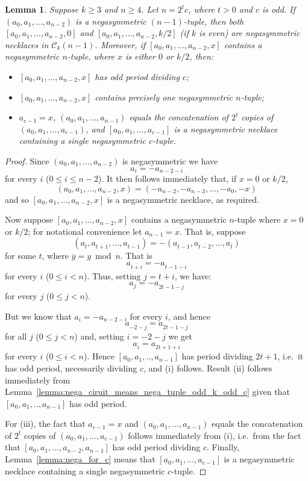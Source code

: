 \documentclass[a4paper,11pt]{article}
\theoremstyle{plain}
\newtheorem{lemma}{Lemma}[section]
\theoremstyle{definition}
\theoremstyle{remark}
\begin{document}
\begin{lemma}  \label{lemma:converse_to_nega_circuit_no_nega_tuples}
Suppose $k\geq 3$ and $n\geq 4$. Let $n=2^tc$, where $t>0$ and $c$ is odd. If
$(a_{0},a_{1},\dots,a_{n-2})$ is a negasymmetric $(n-1)$-tuple, then both
$[a_0,a_1,\dots,a_{n-2},0]$ and $[a_0,a_1,\dots,a_{n-2},k/2]$ (if $k$ is even) are negasymmetric
necklaces in $\mathcal{C}_k(n-1)$. Moreover, if $[a_0,a_1,\dots,a_{n-2},x]$ contains a
negasymmetric $n$-tuple, where $x$ is either $0$ or $k/2$, then:
\begin{itemize}
\item[(i)] $[a_0,a_1,\dots,a_{n-2},x]$ has odd period dividing $c$;
\item[(ii)] $[a_0,a_1,\dots,a_{n-2},x]$ contains precisely one negasymmetric $n$-tuple;
\item[(iii)] $a_{c-1}=x$, $(a_0,a_1,\dots,a_{n-1})$ equals the concatenation of $2^t$ copies of
    $(a_0,a_1,\dots,a_{c-1})$, and $[a_0,a_1,\dots,a_{c-1}]$ is a negasymmetric necklace
    containing a single negasymmetric $c$-tuple.
\end{itemize}
\end{lemma}

\begin{proof}
Since $(a_{0},a_{1},\dots,a_{n-2})$ is negasymmetric we have
\[ a_i=-a_{n-2-i} \]
for every $i$ ($0\leq i\leq n-2$).  It then follows immediately that, if $x=0$ or $k/2$,
\[ (a_{0},a_{1},\dots,a_{n-2},x)=(-a_{n-2},-a_{n-3}, \dots, -a_0, -x) \]
and so $[a_0,a_1,\dots,a_{n-2},x]$ is a negasymmetric necklace, as required.

Now suppose $[a_0,a_1,\dots,a_{n-2},x]$ contains a negasymmetric $n$-tuple where $x=0$ or $k/2$;
for notational convenience let $a_{n-1}=x$. That is, suppose
\[ (a_{\overline{t}},a_{\overline{t+1}},\dots,a_{\overline{t-1}}) =
 -(a_{\overline{t-1}},a_{\overline{t-2}},\dots,a_{\overline{t}}) \]
for some $t$, where $\overline{y}=y\bmod n$.  That is
\[ a_{\overline{t+i}} = -a_{\overline{t-1-i}} \]
for every $i$ ($0\leq i<n$).  Thus, setting $j=t+i$, we have:
\[ a_{j}=-a_{\overline{2t-1-j}} \]
for every $j$ ($0\leq j<n$).

But we know that $a_i=-a_{n-2-i}$ for every $i$, and hence
\[ a_{\overline{-2-j}} = a_{\overline{2t-1-j}} \]
for all $j$ ($0\leq j<n$) and, setting $i=-2-j$ we get
\[ a_{\overline{i}}=a_{\overline{2t+1+i}} \]
for every $i$ ($0\leq i<n$).  Hence $[a_0,a_{1},..,a_{n-1}]$ has period dividing $2t+1$, i.e.\ it
has odd period, necessarily dividing $c$, and (i) follows.  Result (ii) follows immediately from
Lemma~\ref{lemma:nega_ciruit_means_nega_tuple_odd_k_odd_c} given that $[a_0,a_{1},..,a_{n-1}]$ has
odd period.

For (iii), the fact that $a_{c-1}=x$ and $(a_0,a_1,\dots,a_{n-1})$ equals the concatenation of
$2^t$ copies of $(a_0,a_1,\dots,a_{c-1})$ follows immediately from (i), i.e.\ from the fact that
$[a_0,a_1,\dots,a_{n-2},a_{n-1}]$ has odd period dividing $c$.  Finally,
Lemma~\ref{lemma:nega_for_c} means that $[a_0,a_1,\dots,a_{c-1}]$ is a negasymmetric necklace
containing a single negasymmetric $c$-tuple.
\end{proof}
\end{document}
